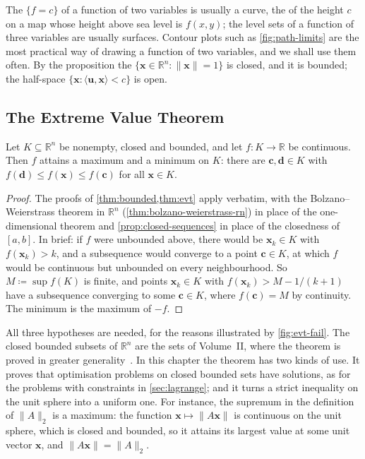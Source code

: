 The  $\{f=c\}$ of a function of two variables is usually a curve, the  of the height $c$ on a map whose height above sea level is $f(x,y)$; the level sets of a function of three variables are usually surfaces. Contour plots such as \cref{fig:path-limits} are the most practical way of drawing a function of two variables, and we shall use them often. By the proposition the  $\{\mathbf x\in\mathbb R^n: \|\mathbf x\|=1\}$ is closed, and it is bounded; the half-space $\{\mathbf x: \langle\mathbf u,\mathbf x\rangle<c\}$ is open.

\subsection{The Extreme Value Theorem}

\begin{theorem}
\label{thm:evt-rn}
Let $K\subseteq\mathbb R^n$ be nonempty, closed and bounded, and let $f\colon K\to\mathbb R$ be continuous. Then $f$ attains a maximum and a minimum on $K$: there are $\mathbf c,\mathbf d\in K$ with $f(\mathbf d)\le f(\mathbf x)\le f(\mathbf c)$ for all $\mathbf x\in K$.
\end{theorem}

\begin{proof}
The proofs of \cref{thm:bounded,thm:evt} apply verbatim, with the Bolzano--Weierstrass theorem in $\mathbb R^n$ (\cref{thm:bolzano-weierstrass-rn}) in place of the one-dimensional theorem and \cref{prop:closed-sequences} in place of the closedness of $[a,b]$. In brief: if $f$ were unbounded above, there would be $\mathbf x_k\in K$ with $f(\mathbf x_k)>k$, and a subsequence would converge to a point $\mathbf c\in K$, at which $f$ would be continuous but unbounded on every neighbourhood. So $M\coloneqq\sup f(K)$ is finite, and points $\mathbf x_k\in K$ with $f(\mathbf x_k)>M-1/(k+1)$ have a subsequence converging to some $\mathbf c\in K$, where $f(\mathbf c)=M$ by continuity. The minimum is the maximum of $-f$.
\end{proof}

All three hypotheses are needed, for the reasons illustrated by \cref{fig:evt-fail}. The closed bounded subsets of $\mathbb R^n$ are the  sets of Volume~II, where the theorem is proved in greater generality~\cite[Thm.~4.16]{rudin1976}. In this chapter the theorem has two kinds of use. It proves that optimisation problems on closed bounded sets have solutions, as for the problems with constraints in \cref{sec:lagrange}; and it turns a strict inequality on the unit sphere into a uniform one. For instance, the supremum in the definition of $\|A\|_2$ is a maximum: the function $\mathbf x\mapsto\|A\mathbf x\|$ is continuous on the unit sphere, which is closed and bounded, so it attains its largest value at some unit vector $\mathbf x$, and $\|A\mathbf x\|=\|A\|_2$.

